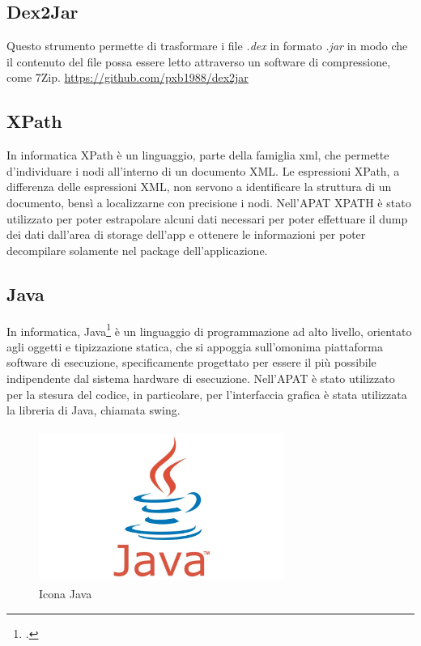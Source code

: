 \subsection*{Dex2Jar}
Questo strumento permette di trasformare i file \textit{.dex} in formato \textit{.jar} in modo
che il contenuto del file possa essere letto attraverso un software di compressione, come 7Zip.
\url{https://github.com/pxb1988/dex2jar}

\subsection*{XPath}\label{subsec:xpath}
In informatica XPath è un linguaggio, parte della famiglia \gls{xml}, che permette d'individuare i nodi all'interno di un documento XML. Le espressioni XPath, a differenza delle espressioni XML, non servono a identificare la struttura di un documento, bensì a localizzarne con precisione i nodi.
Nell'APAT XPATH è stato utilizzato per poter estrapolare alcuni dati necessari per poter effettuare il dump dei dati dall'area di storage dell'app e ottenere le informazioni per poter decompilare solamente nel package dell'applicazione.

\subsection*{Java}
In informatica, Java\footcite{womak:effective-java} è un linguaggio di programmazione ad alto livello, orientato agli oggetti e tipizzazione statica, che si appoggia sull'omonima piattaforma software di esecuzione, specificamente progettato per essere il più possibile indipendente dal sistema hardware di esecuzione.
Nell'APAT è stato utilizzato per la stesura del codice, in particolare, per l'interfaccia grafica è stata utilizzata la libreria di Java, chiamata \gls{swing}.
\begin{figure}[H]
    \centering
    \includegraphics[width=8cm, height=5cm]{./immagini/java.jpg}
    \caption{Icona Java}\label{fig:java}
\end{figure}

